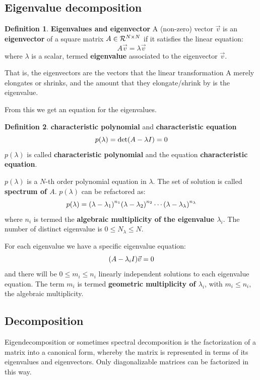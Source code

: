 \documentclass[12pt, letterpaper]{article}
\theoremstyle{definition}
\newtheorem{definition}{Definition}[section]
\DeclarePairedDelimiter\autobracket{(}{)}
\newcommand{\br}[1]{\autobracket*{#1}}
\let\tb\textbf
\begin{document}
\subsection{Eigenvalue decomposition}
\begin{definition}{\tb{Eigenvalues and eigenvector}}
A (non-zero) vector $\vec{v}$ is an \tb{eigenvector} of a square matrix $A \in \CMcal{R}^{N\times N}$ if it satisfies the linear equation:
\begin{equation}
A\vec{v} = \lambda \vec{v}
\label{eigenvector}
\end{equation}
where $\lambda$ is a scalar, termed \tb{eigenvalue} associated to the eigenvector $\vec{v}$. 
\end{definition}
That is, the eigenvectors are the vectors that the linear transformation A merely elongates or shrinks, and the amount that they elongate/shrink by is the eigenvalue.

From this we get an equation for the eigenvalues.
\begin{definition}{\tb{characteristic polynomial} and \tb{characteristic equation}}
\begin{equation}
p(\lambda) = \det\br{A - \lambda I}  = 0
\end{equation}
$p(\lambda)$ is called \tb{characteristic polynomial} and the equation \tb{characteristic equation}.
\end{definition}
$p(\lambda)$ is a $N$-th order polynomial equation in $\lambda$. The set of solution is called \tb{spectrum of $A$}.  
$p(\lambda)$ can be refactored as:
\begin{equation}
p(\lambda) = \br{\lambda - \lambda_1}^{n_1} \br{\lambda - \lambda_2}^{n_2}\cdots \br{\lambda - \lambda_\lambda}^{n_\lambda}
\end{equation}
where $n_i$ is termed the \tb{algebraic multiplicity of the eigenvalue $\lambda_i$}. The number of distinct eigenvalue is $0\le N_\lambda\le N$.

For each eigenvalue we have a specific eigenvalue equation:
\begin{equation}
\br{A-\lambda_i I} \vec{v}= 0
\end{equation}
and there will be $0\le m_i \le n_i$ linearly independent solutions to each eigenvalue equation. The term $m_i$ is termed \tb{geometric multiplicity of $\lambda_i$}, with $m_i \le n_i$, the algebraic multiplicity.

\subsection{Decomposition}
Eigendecomposition or sometimes spectral decomposition is the factorization of a matrix into a canonical form, whereby the matrix is represented in terms of its eigenvalues and eigenvectors. Only diagonalizable matrices can be factorized in this way. 
\end{document}
